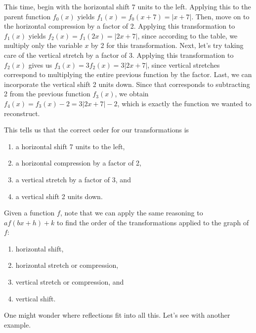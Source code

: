 \documentclass[handout, noauthor, nooutcomes]{ximera}
\begin{document}
\begin{example}
\begin{explanation}
This time, begin with the horizontal shift 7 units to the left. Applying this to the parent function $f_0(x)$ yields $f_1(x) = f_0(x + 7) = |x + 7|$. Then, move on to the horizontal compression by a factor of 2. Applying this transformation to $f_1(x)$ yields $f_2(x) = f_1(2x) = |2x + 7|$, since according to the table, we multiply only the variable $x$ by 2 for this transformation. Next, let's try taking care of the vertical stretch by a factor of 3. Applying this transformation to $f_2(x)$ gives us $f_3(x) = 3f_2(x) = 3|2x + 7|$, since vertical stretches correspond to multiplying the entire previous function by the factor. Last, we can incorporate the vertical shift 2 units down. Since that corresponds to subtracting 2 from the previous function $f_3(x)$, we obtain $f_4(x) = f_3(x) - 2 = 3|2x + 7| - 2$, which is exactly the function we wanted to reconstruct. 

This tells us that the correct order for our transformations is 
\begin{enumerate}
\item a horizontal shift 7 units to the left, 
\item a horizontal compression by a factor of 2,
\item a vertical stretch by a factor of 3, and
\item a vertical shift 2 units down.
\end{enumerate}
\end{explanation}
\end{example}

Given a function $f$, note that we can apply the same reasoning to $af(bx + h) + k$ to find the order of the transformations applied to the graph of $f$:
\begin{enumerate}
\item horizontal shift,
\item horizontal stretch or compression,
\item vertical stretch or compression, and 
\item vertical shift.
\end{enumerate}

One might wonder where reflections fit into all this. Let's see with another example. 
\end{document}
